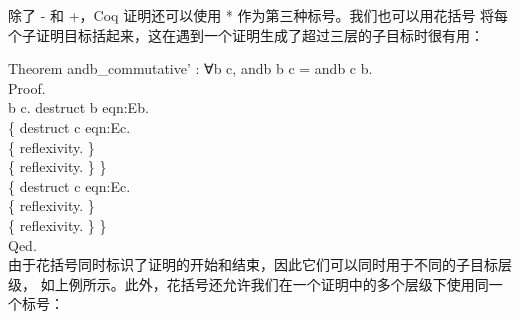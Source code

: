 \documentclass[utf8]{ctexart}
\begin{document}
除了 {-} 和 {+}，Coq 证明还可以使用 {*}
作为第三种标号。我们也可以用花括号
将每个子证明目标括起来，这在遇到一个证明生成了超过三层的子目标时很有用：

{Theorem} {andb\_commutative'} : {∀}{b} {c}, {andb} {b} {c} = {andb} {c}
{b}.\\
{Proof}.\\
\hspace*{0.333em}\hspace*{0.333em}{intros} {b} {c}. {destruct} {b}
{eqn}:{Eb}.\\
\hspace*{0.333em}\hspace*{0.333em}\{ {destruct} {c} {eqn}:{Ec}.\\
\hspace*{0.333em}\hspace*{0.333em}\hspace*{0.333em}\hspace*{0.333em}\{
{reflexivity}. \}\\
\hspace*{0.333em}\hspace*{0.333em}\hspace*{0.333em}\hspace*{0.333em}\{
{reflexivity}. \} \}\\
\hspace*{0.333em}\hspace*{0.333em}\{ {destruct} {c} {eqn}:{Ec}.\\
\hspace*{0.333em}\hspace*{0.333em}\hspace*{0.333em}\hspace*{0.333em}\{
{reflexivity}. \}\\
\hspace*{0.333em}\hspace*{0.333em}\hspace*{0.333em}\hspace*{0.333em}\{
{reflexivity}. \} \}\\
{Qed}.\\

由于花括号同时标识了证明的开始和结束，因此它们可以同时用于不同的子目标层级，
如上例所示。此外，花括号还允许我们在一个证明中的多个层级下使用同一个标号：
\end{document}
